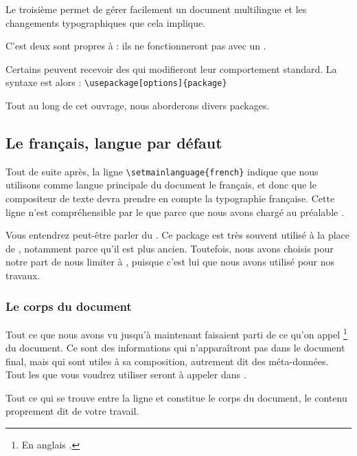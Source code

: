 Le troisième permet de gérer facilement un document multilingue et les changements typographiques que cela implique.

C'est deux  sont propres à  : ils ne fonctionneront pas avec un  \logicile{\LaTeX}.

Certains  peuvent recevoir des  qui modifieront leur comportement standard. La syntaxe est alors : \verb|\usepackage[options]{package}|

Tout au long de cet ouvrage, nous aborderons divers packages.

\subsection{Le fran\c cais, langue par défaut}

Tout de suite après, la ligne \verb|\setmainlanguage{french}| indique que nous utilisons comme langue principale du document le fran\c cais, et donc que le compositeur de texte devra prendre en compte la typographie fran\c caise. Cette ligne n'est compréhensible par le  que parce que nous avons chargé au préalable .

\begin{anedocte}
Vous entendrez peut-être parler du  . Ce package est très souvent utilisé à la place de , notamment parce qu'il est plus ancien. Toutefois, nous avons choisis pour notre part de nous limiter à , puisque c'est lui que nous avons utilisé pour nos travaux.


\end{anedocte}

\subsubsection{Le corps du document}

Tout ce que nous avons vu jusqu'à maintenant faisaient parti de ce qu'on appel \footnote{En anglais .} du document. Ce sont des informations qui n'apparaîtront pas dans le document final, mais qui sont utiles à sa composition, autrement dit des méta-données. Tout les  que vous voudrez utiliser seront à appeler dans .

Tout ce qui se trouve entre la ligne \verb|| et \verb|| constitue le corps du document, le contenu proprement dit de votre travail.

